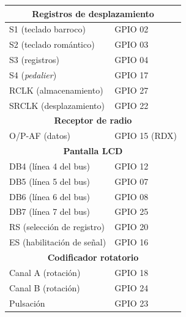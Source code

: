 \begin{center}
	\begin{tabular}{|l|l|}
		\hline \multicolumn{2}{|c|}{\textbf{Registros de desplazamiento}} \\
		\hline S1 (teclado barroco) & GPIO 02 \\ 
		\hline S2 (teclado romántico) & GPIO 03 \\ 
		\hline S3 (registros) & GPIO 04 \\ 
		\hline S4 (\textit{pedalier}) & GPIO 17 \\ 
		\hline RCLK (almacenamiento) & GPIO 27 \\ 
		\hline SRCLK (desplazamiento) & GPIO 22 \\ 
		\hline \multicolumn{2}{|c|}{\textbf{Receptor de radio}} \\
		\hline O/P-AF (datos) & GPIO 15 (RDX) \\ 
		\hline \multicolumn{2}{|c|}{\textbf{Pantalla LCD}} \\
		\hline DB4 (línea 4 del bus) & GPIO 12 \\ 
		\hline DB5 (línea 5 del bus) & GPIO 07 \\ 
		\hline DB6 (línea 6 del bus) & GPIO 08 \\ 
		\hline DB7 (línea 7 del bus) & GPIO 25 \\
		\hline RS (selección de registro) & GPIO 20 \\ 
		\hline ES (habilitación de señal) & GPIO 16 \\ 
		\hline \multicolumn{2}{|c|}{\textbf{Codificador rotatorio}} \\
		\hline Canal A (rotación) & GPIO 18 \\ 
		\hline Canal B (rotación) & GPIO 24 \\ 
		\hline Pulsación & GPIO 23 \\ 
		\hline 
	\end{tabular} 
\end{center}

\smallskip

